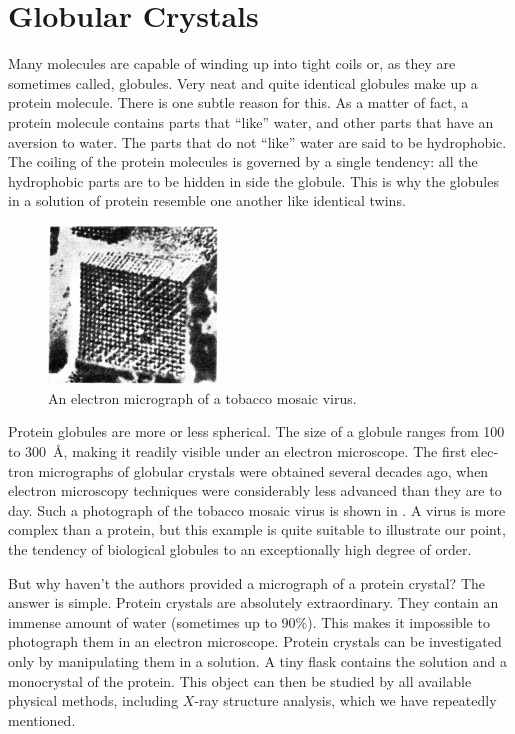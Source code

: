 \section{Globular Crystals}

Many molecules are capable of winding up into tight coils or, as they are sometimes called, globules. Very neat and quite identical globules make up a protein molecule. There is one subtle reason for this. As a matter of fact, a protein molecule contains parts that ``like'' water, and other parts that have an aversion to water. The parts that do not ``like'' water are said to be hydrophobic. The coiling of the protein molecules is governed by a single tendency: all the hydrophobic parts are to be hidden in­ side the globule. This is why the globules in a solution of protein resemble one another like identical twins.


\begin{figure}[!ht]
\centering
\includegraphics[width=0.4\textwidth]{figures/fig-09-03.jpg}
\caption{An electron micrograph of a tobacco mosaic virus.}
\label{fig-9.3}
\end{figure}

Protein globules are more or less spherical. The size of a globule ranges from 100 to \SI{300}{\angstrom}, making it readily visible under an electron microscope. The first elec­tron micrographs of globular crystals were obtained several decades ago, when electron microscopy tech­niques were considerably less advanced than they are to day. Such a photograph of the tobacco mosaic virus is shown in . A virus is more complex than a protein, but this example is quite suitable to illustrate our point, the tendency of biological globules to an ex­ceptionally high degree of order.


But why haven’t the authors provided a micrograph of a protein crystal? The answer is simple. Protein crys­tals are absolutely extraordinary. They contain an im­mense amount of water (sometimes up to 90\%). This makes it impossible to photograph them in an electron microscope. Protein crystals can be investigated only by manipulating them in a solution. A tiny flask contains the solution and a monocrystal of the protein. This object can then be studied by all available physical methods, including $X$-ray structure analysis, which we have re­peatedly mentioned.

